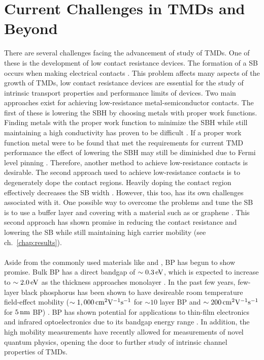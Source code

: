 \section{Current Challenges in \acp{TMD} and Beyond}\label{sec:tmds_and_beyond}
There are several challenges facing the advancement of study of \acp{TMD}. One of these is the development of low contact resistance devices. The formation of a \ac{SB} occurs when making electrical contacts \cite{Fang_NanoLett2012,Das_AppPhysLett2013}. This problem affects many aspects of the growth of \acp{TMD}, low contact resistance devices are essential for the study of intrinsic transport properties and performance limits of devices. Two main approaches exist for achieving low-resistance metal-semiconductor contacts. The first of these is lowering the \ac{SBH} by choosing metals with proper work functions. Finding metals with the proper work function to minimize the \acs{SBH} while still maintaining a high conductivity has proven to be difficult \cite{Liu_ACSnano2012,Das_NanoLett2012}. If a proper work function metal were to be found that met the requirements for current \acs{TMD} performance the effect of lowering the \acs{SBH} may still be diminished due to Fermi level pinning \cite{Gong_NanoLett2014}. Therefore, another method to achieve low-resistance contacts is desirable. The second approach used to achieve low-resistance contacts is to degenerately dope the contact regions. Heavily doping the contact region effectively decreases the \acs{SB} width \cite{Suh_NanoLett2014}. However, this too, has its own challenges associated with it. One possible way to overcome the problems and tune the \acs{SB} is to use a buffer layer and covering with a material such as \hbn or graphene \cite{Geim_Nature2013,Farmanbar_PhysRevB2015,Kappera_NatureMat2014,Farmanbar_arxiv2016}. This second approach has shown promise in reducing the contact resistance and lowering the \acs{SB} while still maintaining high carrier mobility (see ch.~\ref{chap:results}). \\ \\

Aside from the commonly used \td materials like  and , \ac{BP} has begun to show promise. Bulk \acs{BP} has a direct bandgap of $\sim 0.3\,\mathrm{eV}$, which is expected to increase to $\sim 2.0\,\mathrm{eV}$ as the thickness approaches monolayer \cite{Keyes_PhysRev1953,Maruyama_PhysB1981,Tran_PhysRevB2014}. In the past few years, few-layer black phosphorus has been shown to have desireable room temperature field-effect mobility ($\sim 1,000\,\mathrm{cm}^{2}\mathrm{V}^{-1}\mathrm{s}^{-1}$ for $\sim 10$ layer \acs{BP} and $\sim 200\,\mathrm{cm}^{2}\mathrm{V}^{-1}\mathrm{s}^{-1}$ for $5\,\mathrm{nm}$ \acs{BP}) \cite{Li_NatureNano2014,Koenig_AppPhysLett2014,Xia_NatureComm2014}. \acs{BP} has shown potential for applications to thin-film electronics and infrared optoelectronics due to its bandgap energy range \cite{Li_NatureNano2015,Xia_NatureComm2014}. In addition, the high mobility measurements have recently allowed for measurements of novel quantum physics, opening the door to further study of intrinsic channel properties of \acp{TMD}.


